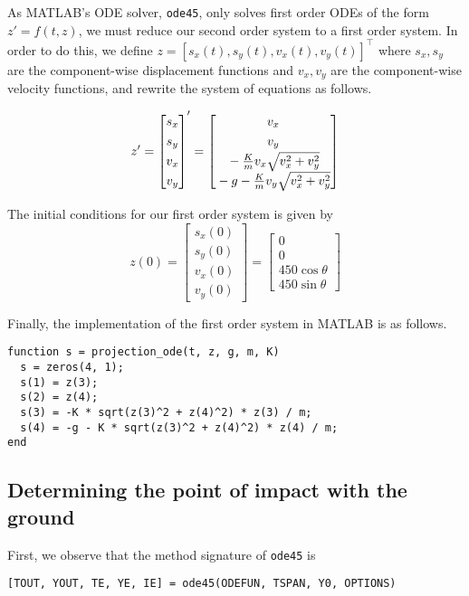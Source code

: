 \noindent
As MATLAB's ODE solver, \lstinline|ode45|, only solves first order ODEs of the form $z' = f(t, z)$, we must reduce our second order system to a first order system. In order to do this, we define $z = [s_x(t), s_y(t), v_x(t), v_y(t)]^\top$ where $s_x, s_y$ are the component-wise displacement functions and $v_x, v_y$ are the component-wise velocity functions, and rewrite the system of equations as follows.

$$
z' = 
\begin{bmatrix}
	\matrixspacinghack s_x \\
	\matrixspacinghack s_y \\
	\matrixspacinghack v_x \\
	\matrixspacinghack v_y
\end{bmatrix}'
=
\begin{bmatrix}
	\matrixspacinghack v_x \\
	\matrixspacinghack v_y \\
	\matrixspacinghack -\frac{K}{m} v_x \sqrt{v_x^2 + v_y^2} \\
	\matrixspacinghack - g -\frac{K}{m} v_y \sqrt{v_x^2 + v_y^2}
\end{bmatrix}
$$

\noindent
The initial conditions for our first order system is given by
$$z(0) = \begin{bmatrix} s_x(0) \\ s_y(0) \\ v_x(0) \\ v_y(0) \end{bmatrix} = \begin{bmatrix} 0 \\ 0 \\ 450 \cos \theta \\ 450 \sin \theta \end{bmatrix}$$

\noindent
Finally, the implementation of the first order system in MATLAB is as follows.

\begin{lstlisting}
function s = projection_ode(t, z, g, m, K)
  s = zeros(4, 1);
  s(1) = z(3);
  s(2) = z(4);
  s(3) = -K * sqrt(z(3)^2 + z(4)^2) * z(3) / m;
  s(4) = -g - K * sqrt(z(3)^2 + z(4)^2) * z(4) / m;
end
\end{lstlisting}

\newpage
\subsection{Determining the point of impact with the ground}
First, we observe that the method signature of \lstinline|ode45| is
\begin{lstlisting}
[TOUT, YOUT, TE, YE, IE] = ode45(ODEFUN, TSPAN, Y0, OPTIONS)
\end{lstlisting}

